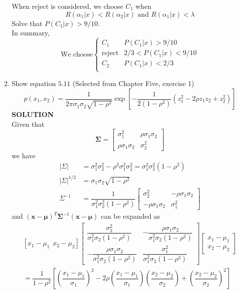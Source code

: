 \documentclass{article}
\begin{document}
\begin{enumerate}
When reject is considered, we choose $C_1$ when
$$
R(\alpha_1|x)<R(\alpha_2|x) \text{ and } R(\alpha_1|x)<\lambda
$$
Solve that $P(C_1|x)>9/10$.\\
In summary, 
$$
\text{We choose} \begin{cases}C_1 & P(C_1|x)>9/10\\ \text{reject} & 2/3<P(C_1|x)<9/10 \\ C_2 & P(C_1|x) < 2/3 \\
\end{cases}
$$
    \item Show equation $5.11$ (Selected from Chapter Five, exercise 1)
    $$
    p\left(x_1, x_2\right)=\frac{1}{2 \pi \sigma_1 \sigma_2 \sqrt{1-\rho^2}} \exp \left[-\frac{1}{2\left(1-\rho^2\right)}\left(z_1^2-2 \rho z_1 z_2+z_2^2\right)\right]
    $$
    \textbf{SOLUTION}\\
    Given that
$$
\boldsymbol{\Sigma}=\left[\begin{array}{cc}
\sigma_1^2 & \rho \sigma_1 \sigma_2 \\
\rho \sigma_1 \sigma_2 & \sigma_2^2
\end{array}\right]
$$
we have
$$
\begin{aligned}
|\Sigma| &=\sigma_1^2 \sigma_2^2-\rho^2 \sigma_1^2 \sigma_2^2=\sigma_1^2 \sigma_2^2\left(1-\rho^2\right) \\
|\Sigma|^{1 / 2} &=\sigma_1 \sigma_2 \sqrt{1-\rho^2} \\
\Sigma^{-1} &=\dfrac{1}{\sigma_1^2 \sigma_2^2\left(1-\rho^2\right)}\left[\begin{array}{cc}
\sigma_2^2 & -\rho \sigma_1 \sigma_2 \\
-\rho \sigma_1 \sigma_2 & \sigma_1^2
\end{array}\right]
\end{aligned}
$$
and $(\boldsymbol{x}-\boldsymbol{\mu})^T \boldsymbol{\Sigma}^{-1}(\boldsymbol{x}-\boldsymbol{\mu})$ can be expanded as
$$
\begin{array}{r}
{\left[x_1-\mu_1 ~~ x_2-\mu_2\right]\left[\begin{array}{cc}
\dfrac{\sigma_2^2}{\sigma_1^2 \sigma_2\left(1-\rho^2\right)} & -\dfrac{\rho \sigma_1 \sigma_2}{\sigma_1^2 \sigma_2\left(1-\rho^2\right)} \\
-\dfrac{\rho \sigma_1 \sigma_2}{\sigma_1^2 \sigma_2\left(1-\rho^2\right)} & \dfrac{\sigma_1^2}{\sigma_1^2 \sigma_2\left(1-\rho^2\right)}
\end{array}\right]\left[\begin{array}{c}
x_1-\mu_1 \\
x_2-\mu_2
\end{array}\right]} \\
=\dfrac{1}{1-\rho^2}\left[\left(\dfrac{x_1-\mu_1}{\sigma_1}\right)^2-2 \rho\left(\dfrac{x_1-\mu_1}{\sigma_1}\right)\left(\dfrac{x_2-\mu_2}{\sigma_2}\right)+\left(\dfrac{x_2-\mu_2}{\sigma_2}\right)^2\right]
\end{array}
$$


\end{enumerate}
\end{document}
